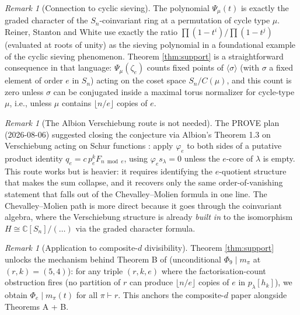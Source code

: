 \documentclass[11pt]{article}
\theoremstyle{remark}
\newtheorem{remark}[theorem]{Remark}
\newcommand{\qe}{q_e}
\newcommand{\zetae}{\zeta_e}
\newcommand{\CC}{\mathbb{C}}
\begin{document}
\begin{remark}[Connection to cyclic sieving]
The polynomial $\Psi_\mu(t)$ is exactly the graded character of the $S_n$-coinvariant ring at a permutation of cycle type $\mu$. Reiner, Stanton and White \cite{RSW04} use exactly the ratio $\prod(1-t^i)/\prod(1-t^j)$ (evaluated at roots of unity) as the sieving polynomial in a foundational example of the cyclic sieving phenomenon. Theorem \ref{thm:support} is a straightforward consequence in that language: $\Psi_\mu(\zetae)$ counts fixed points of $\langle \sigma\rangle$ (with $\sigma$ a fixed element of order $e$ in $S_n$) acting on the coset space $S_n/C(\mu)$, and this count is zero unless $\sigma$ can be conjugated inside a maximal torus normalizer for cycle-type $\mu$, i.e., unless $\mu$ contains $\lfloor n/e\rfloor$ copies of $e$.
\end{remark}

\begin{remark}[The Albion Verschiebung route is not needed]
The PROVE plan (2026-08-06) suggested closing the conjecture via Albion's Theorem 1.3 on Verschiebung acting on Schur functions \cite{Alb26}: apply $\varphi_e$ to both sides of a putative product identity $\qe = c\, p_e^k F_{n\bmod e}$, using $\varphi_e s_\lambda = 0$ unless the $e$-core of $\lambda$ is empty. This route works but is heavier: it requires identifying the $e$-quotient structure that makes the sum collapse, and it recovers only the same order-of-vanishing statement that falls out of the Chevalley--Molien formula in one line. The Chevalley--Molien path is more direct because it goes through the coinvariant algebra, where the Verschiebung structure is already \emph{built in} to the isomorphism $H \cong \CC[S_n]/(\ldots)$ via the graded character formula.
\end{remark}

\begin{remark}[Application to composite-$d$ divisibility]
Theorem \ref{thm:support} unlocks the mechanism behind Theorem B of \cite{Cli26} (unconditional $\Phi_9 \mid m_\pi$ at $(r, k) = (5, 4)$): for any triple $(r, k, e)$ where the factorisation-count obstruction fires (no partition of $r$ can produce $\lfloor n/e\rfloor$ copies of $e$ in $p_\lambda[h_k]$), we obtain $\Phi_e \mid m_\pi(t)$ for all $\pi \vdash r$. This anchors the composite-$d$ paper alongside Theorems A + B.
\end{remark}
\end{document}
